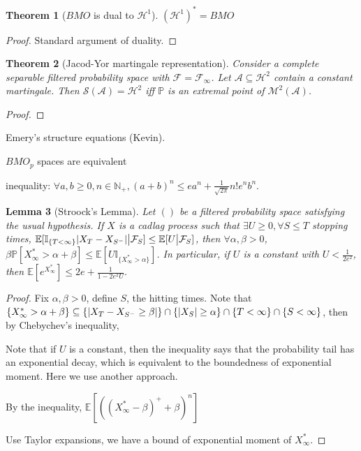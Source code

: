 \documentclass[openany,oneside]{book}
\newtheorem{thm}{Theorem}[section]
\newtheorem{lem}[thm]{Lemma}
\theoremstyle{definition}
\theoremstyle{remark}
\newcommand{\E}{\mathbb{E}} %
\renewcommand{\P}{\mathbb{P}} %
\newcommand{\I}{\mathbb{I}} %
\DeclarePairedDelimiter{\abs}{\lvert}{\rvert} %
\newcommand{\sH}[1][2]{\mathcal{H}^{#1}} %
\begin{document}
\begin{thm}[$BMO$ is dual to $\mathcal{H}^1$]
$(\mathcal{H}^1)^* = BMO$
\end{thm}
\begin{proof}
Standard argument of duality.
\end{proof}


\begin{thm}[Jacod-Yor martingale representation]
Consider a complete separable filtered probability space with $\mathcal{F}=\mathcal{F}_\infty$. Let $\mathcal{A}\subseteq \sH$ contain a constant martingale. Then $\mathcal{S}(\mathcal{A}) = \sH$ iff $\P$ is an extremal point of $\mathcal{M}^2(\mathcal{A})$.
\end{thm}
\begin{proof}

\end{proof}


Emery's structure equations (Kevin).


$BMO_p$ spaces are equivalent

inequality: $\forall a,b\ge 0, n\in \mathbb{N}_+, (a+b)^n \le e a^n + \frac{1}{\sqrt{2\pi}} n! e^n b^n$.

\begin{lem}[Stroock's Lemma]
Let $()$ be a filtered probability space satisfying the usual hypothesis. If $X$ is a cadlag process such that $\exists U\ge 0, \forall S\le T$ stopping times, $\E[\I_{\{T<\infty\}}\abs{X_T - X_{S^-}} \big\vert \mathcal{F}_S] \le \E[U \big\vert \mathcal{F}_S]$, then $\forall \alpha,\beta >0$, $\beta \P[X^\ast_\infty > \alpha + \beta] \le \E[U\I_{\{X^\ast_\infty>\alpha\}}]$. In particular, if $U$ is a constant with $U<\frac{1}{2e^2}$, then $\E[e^{X^\ast_\infty}] \le 2e + \frac{1}{1-2e^2 U}$.
\end{lem}
\begin{proof}
Fix $\alpha,\beta>0$, define $S$, the hitting times. Note that $\{X^\ast_\infty > \alpha + \beta\} \subseteq \{\abs{X_T-X_{S^-} \ge \beta}\} \cap \{\abs{X_S} \ge \alpha\} \cap \{T<\infty\} \cap \{S<\infty\}$, then by Chebychev's inequality,

Note that if $U$ is a constant, then the inequality says that the probability tail has an exponential decay, which is equivalent to the boundedness of exponential moment. Here we use another approach.

By the inequality, $\E[\left((X^\ast_\infty-\beta)^+ + \beta \right)^n]$

Use Taylor expansions, we have a bound of exponential moment of $X^\ast_\infty$.
\end{proof}
\end{document}
